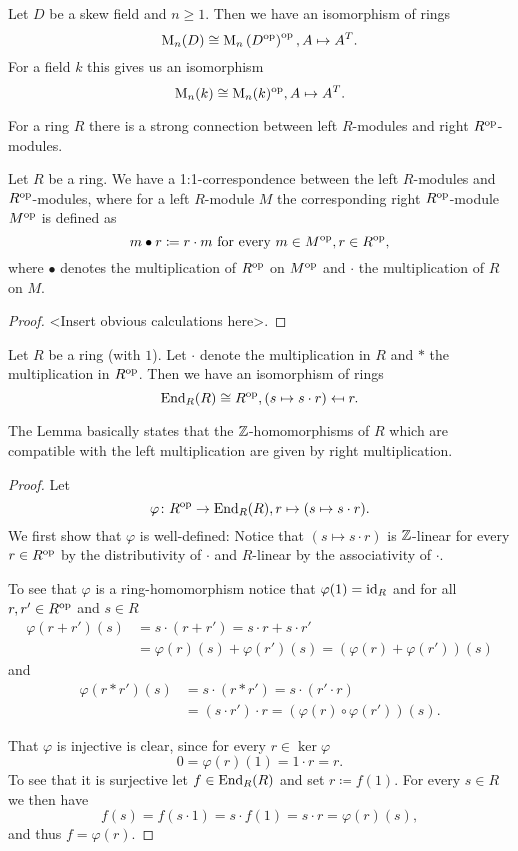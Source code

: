 \begin{expl}
 Let $D$ be a skew field and $n \geq 1$. Then we have an isomorphism of rings
 \[
  \operatorname{M}_n(D) \cong \operatorname{M}_n\left( D^{\mathrm{op}} \right)^{\mathrm{op}}, A \mapsto A^T.
 \]
 For a field $k$ this gives us an isomorphism
 \[
  \operatorname{M}_n(k) \cong \operatorname{M}_n(k)^{\mathrm{op}}, A \mapsto A^T.
 \]
\end{expl}


For a ring $R$ there is a strong connection between left $R$-modules and right $R^{\mathrm{op}}$-modules.


\begin{prop}\label{prop: opposite modules}
 Let $R$ be a ring. We have a 1:1-correspondence between the left $R$-modules and $R^{\mathrm{op}}$-modules, where for a left $R$-module $M$ the corresponding right $R^{\mathrm{op}}$-module $M^{\mathrm{op}}$ is defined as
 \[
  m \bullet r \coloneqq r \cdot m \text{ for every } m \in M^{\mathrm{op}}, r \in R^{\mathrm{op}},
 \]
 where $\bullet$ denotes the multiplication of $R^{\mathrm{op}}$ on $M^{\mathrm{op}}$ and $\cdot$ the multiplication of $R$ on $M$.
\end{prop}
\begin{proof}
 <Insert obvious calculations here>.
\end{proof}


\begin{lem}
 Let $R$ be a ring (with $1$). Let $\cdot$ denote the multiplication in $R$ and $*$ the multiplication in $R^{\mathrm{op}}$. Then we have an isomorphism of rings
 \[
  \operatorname{End}_R(R) \cong R^{\mathrm{op}},
  (s \mapsto s \cdot r) \mapsfrom r.
 \]
\end{lem}


The Lemma basically states that the $\mathbb{Z}$-homomorphisms of $R$ which are compatible with the left multiplication are given by right multiplication.


\begin{proof}
 Let
 \[
  \varphi \colon R^{\mathrm{op}} \to \operatorname{End}_R(R), r \mapsto (s \mapsto s \cdot r).
 \]
 We first show that $\varphi$ is well-defined: Notice that $(s \mapsto s \cdot r)$ is $\mathbb{Z}$-linear for every $r \in R^{\mathrm{op}}$ by the distributivity of $\cdot$ and $R$-linear by the associativity of $\cdot$.
 
 To see that $\varphi$ is a ring-homomorphism notice that $\varphi(1) = \operatorname{id}_R$ and for all $r,r' \in R^{\mathrm{op}}$ and $s \in R$
 \begin{align*}
  \varphi(r+r')(s)
  &= s \cdot (r + r')
  = s \cdot r + s \cdot r' \\
  &= \varphi(r)(s) + \varphi(r')(s)
  = (\varphi(r)+\varphi(r'))(s)
 \end{align*}
 and
 \begin{align*}
  \varphi(r * r')(s)
  &= s \cdot (r * r')
  = s \cdot (r' \cdot r) \\
  &= (s \cdot r') \cdot r
  = \left(\varphi(r) \circ \varphi(r')\right)(s).
 \end{align*}
 
 That $\varphi$ is injective is clear, since for every $r \in \ker \varphi$
 \[
  0 = \varphi(r)(1) = 1 \cdot r = r.
 \]
 To see that it is surjective let $f \in \operatorname{End}_R(R)$ and set $r \coloneqq f(1)$. For every $s \in R$ we then have
 \[
  f(s) = f(s \cdot 1) = s \cdot f(1) = s \cdot r = \varphi(r)(s),
 \]
 and thus $f = \varphi(r)$.
\end{proof}


